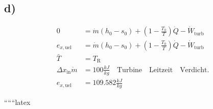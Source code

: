 

\subsection*{d)}
\begin{align*}
    0 &= \dot{m} \left( h_0 - s_0 \right) + \left( 1 - \frac{T_0}{T} \right) \dot{Q} - \dot{W}_{\text{turb}} \\
    e_{x, \text{uel}} &= \dot{m} \left( h_0 - s_0 \right) + \left( 1 - \frac{T_0}{T} \right) \dot{Q} - \dot{W}_{\text{turb}} \\
    \bar{T} &= T_{\text{R}} \\
    \Delta x_{\text{in}} \dot{m} &= 100 \frac{kJ}{kg} \quad \text{Turbine} \quad \text{Leitzeit} \quad \text{Verdicht.} \\
    e_{x, \text{uel}} &= 109.582 \frac{kJ}{kg}
\end{align*}

``````latex